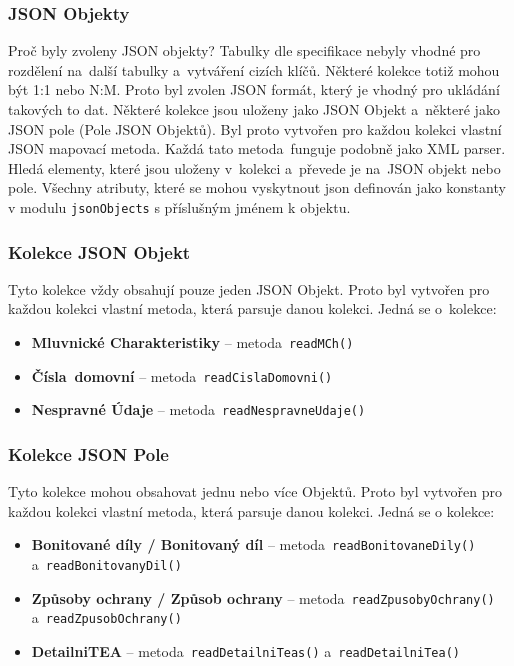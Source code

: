 \subsubsection*{JSON Objekty}
Proč byly zvoleny JSON objekty? Tabulky dle specifikace nebyly vhodné pro rozdělení na~další tabulky a~vytváření cizích klíčů.
Některé kolekce totiž mohou být 1:1 nebo N:M. Proto byl zvolen JSON formát, který je vhodný pro ukládání takových to dat.
Některé kolekce jsou uloženy jako JSON Objekt a~některé jako JSON pole (Pole JSON Objektů).
Byl proto vytvořen pro každou kolekci vlastní JSON mapovací metoda. Každá tato metoda~funguje podobně jako XML parser.
Hledá elementy, které jsou uloženy v~kolekci a~převede je na~JSON objekt nebo pole.
Všechny atributy, které se mohou vyskytnout json definován jako konstanty v modulu \texttt{jsonObjects} s příslušným jménem k objektu.

\subsubsection*{Kolekce JSON Objekt}
Tyto kolekce vždy obsahují pouze jeden JSON Objekt.
Proto byl vytvořen pro každou kolekci vlastní metoda, která parsuje danou kolekci.
Jedná se o~kolekce:
\begin{itemize}
    \item \textbf{Mluvnické Charakteristiky} -- metoda~\texttt{readMCh()}
    \item \textbf{Čísla~domovní} -- metoda~\texttt{readCislaDomovni()}
    \item \textbf{Nespravné Údaje} -- metoda~\texttt{readNespravneUdaje()}
\end{itemize}

\subsubsection*{Kolekce JSON Pole}
Tyto kolekce mohou obsahovat jednu nebo více Objektů.
Proto byl vytvořen pro každou kolekci vlastní metoda, která parsuje danou kolekci.
Jedná se o kolekce:
\begin{itemize}
    \item \textbf{Bonitované díly / Bonitovaný díl} -- metoda~\texttt{readBonitovaneDily()} a~\texttt{readBonitovanyDil()}
    \item \textbf{Způsoby ochrany / Způsob ochrany} -- metoda~\texttt{readZpusobyOchrany()} a~\texttt{readZpusobOchrany()}
    \item \textbf{DetailniTEA} -- metoda~\texttt{readDetailniTeas()} a~\texttt{readDetailniTea()}
\end{itemize}

